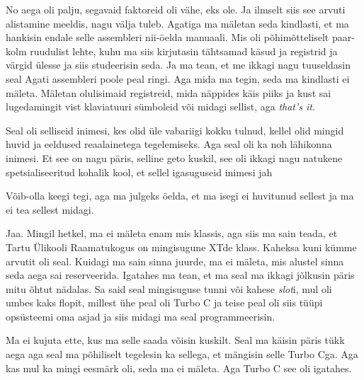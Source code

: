 
No aega oli palju, segavaid faktoreid oli vähe, eks ole. Ja ilmselt siis see 
arvuti alistamine meeldis, nagu välja tuleb. Agatiga ma 
mäletan seda kindlasti, et ma hankisin endale selle 
assembleri nii-öelda manuaali. Mis oli põhimõtteliselt 
paar-kolm ruudulist lehte, kuhu ma siis kirjutasin tähtsamad käsud ja registrid 
ja värgid ülesse ja siis studeerisin seda. Ja ma tean, et me ikkagi nagu 
tuuseldasin seal Agati assembleri poole peal ringi. Aga mida ma tegin, seda ma 
kindlasti ei mäleta. Mäletan olulisimaid registreid, mida näppides käis piiks 
ja kust sai lugedamingit vist klaviatuuri sümboleid või midagi sellist, aga 
\emph{that's it}.


Seal oli  selliseid inimesi, kes olid üle vabariigi kokku tulnud, kellel olid  
mingid huvid ja eeldused  reaalainetega tegelemiseks. Aga seal oli ka noh 
lähikonna inimesi. Et see on nagu päris, selline geto kuskil, see oli ikkagi 
nagu natukene spetsialiseeritud kohalik kool, et sellel igasuguseid inimesi jah


Võib-olla keegi tegi, aga  ma julgeks öelda, et ma isegi ei huvitunud sellest 
ja ma ei tea sellest midagi. 


Jaa. Mingil hetkel, ma ei mäleta enam mis klassis, aga siis ma sain teada, et 
Tartu Ülikooli Raamatukogus on mingisugune 
XTde klass. Kaheksa kuni kümme arvutit oli seal. Kuidagi ma 
sain sinna juurde, ma ei mäleta, mis alustel sinna seda aega sai reserveerida. 
Igatahes ma tean, et ma seal ma ikkagi jõlkusin päris mitu õhtut nädalas. Sa 
said seal mingisuguse tunni või kahese \emph{slot}i, mul oli umbes kaks flopit, 
millest ühe peal oli Turbo C ja teise peal oli siis tüüpi 
opsüsteemi oma asjad ja siis  midagi ma seal programmeerisin. 


Ma ei kujuta ette, kus ma selle saada võisin kuskilt. Seal ma käisin päris tükk 
aega aga seal ma põhiliselt tegelesin ka sellega, et mängisin selle Turbo Cga. 
Aga kas mul ka mingi eesmärk oli, seda ma ei mäleta. Aga Turbo C see oli 
igatahes.


